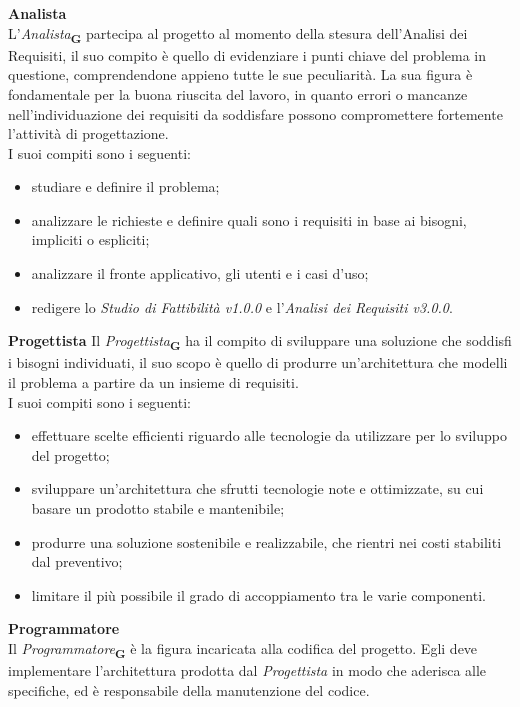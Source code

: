 \textbf{Analista}\\
L'\textit{Analista}\textsubscript{\textbf{G}} partecipa al progetto al momento della stesura dell'Analisi dei Requisiti, il suo compito è quello di evidenziare i punti chiave del problema in questione, comprendendone appieno tutte le sue peculiarità. La sua figura è fondamentale per la buona riuscita del lavoro, in quanto errori o mancanze nell'individuazione dei requisiti da soddisfare possono compromettere fortemente l'attività di progettazione.\\
I suoi compiti sono i seguenti:
\begin{itemize}
    \item studiare e definire il problema;
    \item analizzare le richieste e definire quali sono i requisiti in base ai bisogni, impliciti o espliciti;
    \item analizzare il fronte applicativo, gli utenti e i casi d’uso;
    \item redigere lo \textit{Studio di Fattibilità v1.0.0} e l’\textit{Analisi dei Requisiti v3.0.0}.
\end{itemize}
\textbf{Progettista}
Il \textit{Progettista}\textsubscript{\textbf{G}} ha il compito di sviluppare una soluzione che soddisfi i bisogni individuati, il suo scopo è quello di produrre un'architettura che modelli il problema a partire da un insieme di requisiti.\\
I suoi compiti sono i seguenti:
\begin{itemize}
    \item effettuare scelte efficienti riguardo alle tecnologie da utilizzare per lo sviluppo del progetto;
    \item sviluppare un'architettura che sfrutti tecnologie note e ottimizzate, su cui basare un prodotto stabile e mantenibile;
    \item produrre una soluzione sostenibile e realizzabile, che rientri nei costi stabiliti dal preventivo;
    \item limitare il più possibile il grado di accoppiamento tra le varie componenti.
\end{itemize}
\textbf{Programmatore}\\
Il \textit{Programmatore}\textsubscript{\textbf{G}} è la figura incaricata alla codifica del progetto. Egli deve implementare l’architettura prodotta dal \textit{Progettista} in modo che aderisca alle specifiche, ed è responsabile della manutenzione del codice.\\


